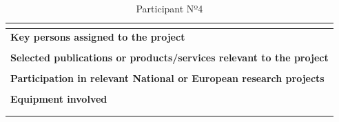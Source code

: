 \begin{longtable}[H]{|p{0.7cm}|p{4cm}|p{7cm}|p{1.3cm}|}
	\multicolumn{4}{|p{13cm}|}{}  \\ \hline
	
	\multicolumn{4}{|p{13cm}|}{\textbf{Key persons assigned to the project}}   \\ \hline
	
	\multicolumn{4}{|p{13cm}|}{}  \\ \hline
	
	\multicolumn{4}{|p{13cm}|}{\textbf{Selected publications or products/services relevant to the project}}  \\ \hline
	
	\multicolumn{4}{|p{13cm}|}{}  \\ \hline
	
	\multicolumn{4}{|p{13cm}|}{\textbf{Participation in relevant National or European research projects}}  \\ \hline
	
	\multicolumn{4}{|p{13cm}|}{}  \\ \hline
	
	\multicolumn{4}{|p{13cm}|}{\textbf{Equipment involved}}  \\ \hline
	
	\multicolumn{4}{|p{13cm}|}{}  \\ \hline
	\caption{Participant Nº4}
\end{longtable}


